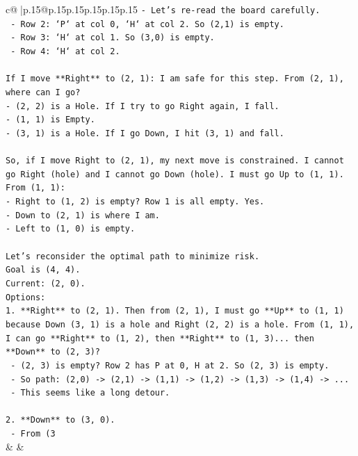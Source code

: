 \documentclass{article}
\begin{document}
{\begin{supertabular}{c@{$\;$}|p{.15\linewidth}@{}p{.15\linewidth}p{.15\linewidth}p{.15\linewidth}p{.15\linewidth}p{.15\linewidth}}
{{{\texttt{{-} Let's re{-}read the board carefully.} \\
\texttt{  {-} Row 2: `P` at col 0, `H` at col 2. So (2,1) is empty.} \\
\texttt{  {-} Row 3: `H` at col 1. So (3,0) is empty.} \\
\texttt{  {-} Row 4: `H` at col 2.} \\
\\ 
\texttt{If I move **Right** to (2, 1): I am safe for this step. From (2, 1), where can I go?} \\
\texttt{{-} (2, 2) is a Hole. If I try to go Right again, I fall.} \\
\texttt{{-} (1, 1) is Empty.} \\
\texttt{{-} (3, 1) is a Hole. If I go Down, I hit (3, 1) and fall.} \\
\\ 
\texttt{So, if I move Right to (2, 1), my next move is constrained. I cannot go Right (hole) and I cannot go Down (hole). I must go Up to (1, 1).} \\
\texttt{From (1, 1):} \\
\texttt{{-} Right to (1, 2) is empty? Row 1 is all empty. Yes.} \\
\texttt{{-} Down to (2, 1) is where I am.} \\
\texttt{{-} Left to (1, 0) is empty.} \\
\\ 
\texttt{Let's reconsider the optimal path to minimize risk.} \\
\texttt{Goal is (4, 4).} \\
\texttt{Current: (2, 0).} \\
\texttt{Options:} \\
\texttt{1. **Right** to (2, 1). Then from (2, 1), I must go **Up** to (1, 1) because Down (3, 1) is a hole and Right (2, 2) is a hole. From (1, 1), I can go **Right** to (1, 2), then **Right** to (1, 3)... then **Down** to (2, 3)?} \\
\texttt{   {-} (2, 3) is empty? Row 2 has P at 0, H at 2. So (2, 3) is empty.} \\
\texttt{   {-} So path: (2,0) {-}> (2,1) {-}> (1,1) {-}> (1,2) {-}> (1,3) {-}> (1,4) {-}> ...} \\
\texttt{   {-} This seems like a long detour.} \\
\\ 
\texttt{2. **Down** to (3, 0).} \\
\texttt{   {-} From (3} \\
            }
        }
    }
    & & \\ \\


\end{supertabular}}
\end{document}
